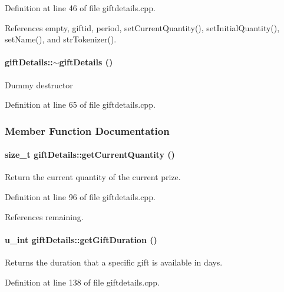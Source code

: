 Definition at line 46 of file giftdetails.cpp.

References empty, giftid, period, set\-Current\-Quantity(), set\-Initial\-Quantity(), set\-Name(), and str\-Tokenizer().\hypertarget{classgiftDetails_giftDetailsa3}{
\paragraph[$\sim$giftDetails]{\setlength{\rightskip}{0pt plus 5cm}gift\-Details::$\sim$gift\-Details ()}\hfill}
\label{classgiftDetails_giftDetailsa3}


Dummy destructor 

Definition at line 65 of file giftdetails.cpp.

\subsubsection{Member Function Documentation}
\hypertarget{classgiftDetails_giftDetailsa7}{
\paragraph[getCurrentQuantity]{\setlength{\rightskip}{0pt plus 5cm}size\_\-t gift\-Details::get\-Current\-Quantity ()}\hfill}
\label{classgiftDetails_giftDetailsa7}


Return the current quantity of the current prize. 

Definition at line 96 of file giftdetails.cpp.

References remaining.\hypertarget{classgiftDetails_giftDetailsa15}{
\paragraph[getGiftDuration]{\setlength{\rightskip}{0pt plus 5cm}u\_\-int gift\-Details::get\-Gift\-Duration ()}\hfill}
\label{classgiftDetails_giftDetailsa15}


Returns the duration that a specific gift is available in days. 

Definition at line 138 of file giftdetails.cpp.

